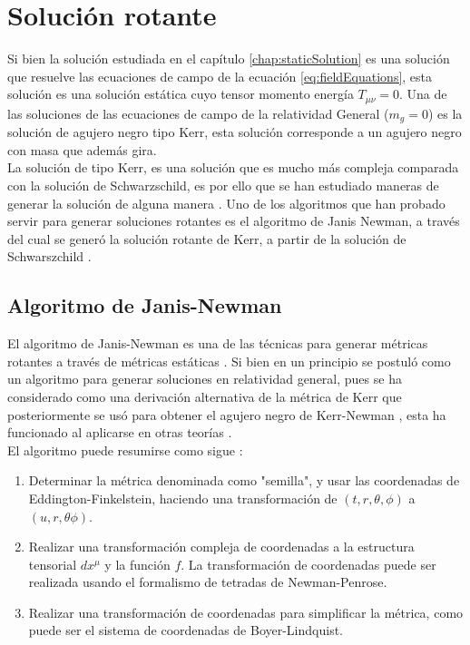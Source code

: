 \chapter{Solución rotante}
\label{chap:Rotante}

Si bien la solución estudiada en el capítulo \ref{chap:staticSolution} es una solución que resuelve las ecuaciones de campo de la ecuación \eqref{eq:fieldEquations}, esta solución es una solución estática cuyo tensor momento energía $T_{\mu\nu}=0$. Una de las soluciones de las ecuaciones de campo de la relatividad General ($m_g=0$) es la solución de agujero negro tipo Kerr, esta solución corresponde a un agujero negro con masa que además gira.\\

La solución de tipo Kerr, es una solución que es mucho más compleja comparada con la solución de Schwarzschild, es por ello que se han estudiado maneras de generar la solución de alguna manera \cite{JN-RotatingAndNUTCharged}. Uno de los algoritmos que han probado servir para generar soluciones rotantes es el algoritmo de Janis Newman, a través del cual se generó la solución rotante de Kerr, a partir de la solución de Schwarszchild \cite{JN-RotatingAndNUTCharged}.

\section{Algoritmo de Janis-Newman}

El algoritmo de Janis-Newman es una de las técnicas para generar métricas rotantes a través de métricas estáticas \cite{JN-RotatingAndNUTCharged}. Si bien en un principio se postuló como un algoritmo para generar soluciones en relatividad general, pues se ha considerado como una derivación alternativa de la métrica de Kerr que posteriormente se usó para obtener el agujero negro de Kerr-Newman \cite{JN-RotatingAndNUTCharged, AnExtensionOfJN}, esta ha funcionado al aplicarse en otras teorías \cite{JN-RotatingAndNUTCharged}.\\

El algoritmo puede resumirse como sigue \cite{JN-RotatingAndNUTCharged, AnExtensionOfJN}: 

\begin{enumerate}
    \item Determinar la métrica denominada como  "semilla", y usar las coordenadas de Eddington-Finkelstein, haciendo una transformación de $(t,r,\theta,\phi)$ a $(u,r,\theta\phi)$.
    \item Realizar una transformación compleja de coordenadas a la estructura tensorial $dx^\mu$ y la función $f$. La transformación de coordenadas puede ser realizada usando el formalismo de tetradas de Newman-Penrose.
    \item Realizar una transformación de coordenadas para simplificar la métrica, como puede ser el sistema de coordenadas de Boyer-Lindquist.
\end{enumerate}

